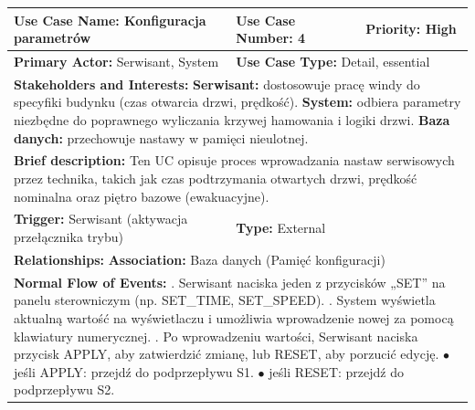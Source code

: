 \documentclass[a4paper,12pt]{article}
\begin{document}
\begin{table}[h]
\centering
\begin{tabular}{|p{}|p{}|p{}|}
\hline
\textbf{Use Case Name:} Konfiguracja parametrów & \textbf{Use Case Number:} 4 & \textbf{Priority:} High \\ \hline
\textbf{Primary Actor:} Serwisant, System & \multicolumn{2}{l|}{\textbf{Use Case Type:} Detail, essential} \\ \hline
\multicolumn{3}{|p{0.9\textwidth}|}{\textbf{Stakeholders and Interests:} \newline
\textbf{Serwisant:} dostosowuje pracę windy do specyfiki budynku (czas otwarcia drzwi, prędkość). \newline
\textbf{System:} odbiera parametry niezbędne do poprawnego wyliczania krzywej hamowania i logiki drzwi. \newline
\textbf{Baza danych:} przechowuje nastawy w pamięci nieulotnej.} \\ \hline
\multicolumn{3}{|p{0.9\textwidth}|}{\textbf{Brief description:} Ten UC opisuje proces wprowadzania nastaw serwisowych przez technika, takich jak czas podtrzymania otwartych drzwi, prędkość nominalna oraz piętro bazowe (ewakuacyjne).} \\ \hline
\textbf{Trigger:} Serwisant (aktywacja przełącznika trybu) & \multicolumn{2}{l|}{\textbf{Type:} External} \\ \hline
\multicolumn{3}{|p{0.9\textwidth}|}{\textbf{Relationships:} \newline
\textbf{Association:} Baza danych (Pamięć konfiguracji) } \\ \hline
\multicolumn{3}{|p{0.9\textwidth}|}{\textbf{Normal Flow of Events:} \newline
1. Serwisant naciska jeden z przycisków „SET” na panelu sterowniczym (np. SET\_TIME, SET\_SPEED).  \newline
2. System wyświetla aktualną wartość na wyświetlaczu i umożliwia wprowadzenie nowej za pomocą klawiatury numerycznej. \newline
3. Po wprowadzeniu wartości, Serwisant naciska przycisk APPLY, aby zatwierdzić zmianę, lub RESET, aby porzucić edycję. \newline
\hspace*{10pt} $\bullet$ jeśli APPLY: przejdź do podprzepływu S1. \newline
\hspace*{10pt} $\bullet$ jeśli RESET: przejdź do podprzepływu S2. \newline
}
\end{tabular}
\end{table}
\end{document}
